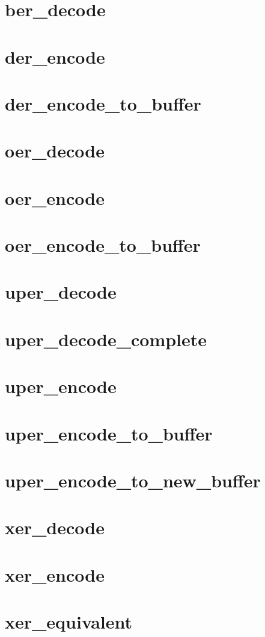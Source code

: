\documentclass[english,oneside,12pt]{book}
\begin{document}
\section{ber\_decode}
\section{der\_encode}
\section{der\_encode\_to\_buffer}
\section{oer\_decode}
\section{oer\_encode}
\section{oer\_encode\_to\_buffer}
\section{uper\_decode}
\section{uper\_decode\_complete}
\section{uper\_encode}
\section{uper\_encode\_to\_buffer}
\section{uper\_encode\_to\_new\_buffer}
\section{xer\_decode}
\section{xer\_encode}
\section{xer\_equivalent}
\end{document}
